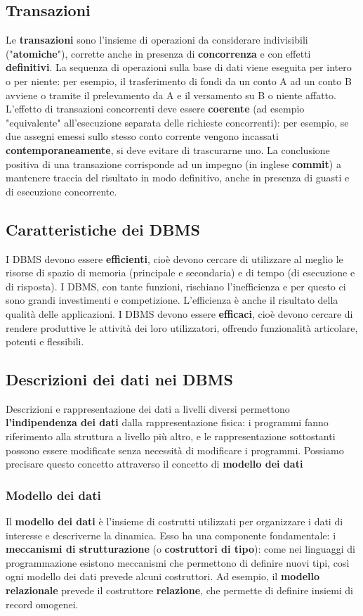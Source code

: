 \documentclass[12pt]{article}
\begin{document}
\subsection{Transazioni}
Le \textbf{transazioni} sono l'insieme di operazioni da considerare indivisibili ("\textbf{atomiche}"), corrette anche in presenza di \textbf{concorrenza} e con effetti \textbf{definitivi}.
La sequenza di operazioni sulla base di dati viene eseguita per intero o per niente: per esempio, il trasferimento di fondi da un conto A ad un conto B avviene o tramite il prelevamento da A e il versamento su B o niente affatto.
L'effetto di transazioni concorrenti deve essere \textbf{coerente} (ad esempio "equivalente" all'esecuzione separata delle richieste concorrenti): per esempio, se due assegni emessi sullo stesso conto corrente vengono incassati \textbf{contemporaneamente},
si deve evitare di trascurarne uno.
La conclusione positiva di una transazione corrisponde ad un impegno (in inglese \textbf{commit}) a mantenere traccia del risultato in modo definitivo, anche in presenza di guasti e di esecuzione concorrente.
\subsection{Caratteristiche dei DBMS}
I DBMS devono essere \textbf{efficienti}, cioè devono cercare di utilizzare al meglio le risorse di spazio di memoria (principale e secondaria) e di tempo (di esecuzione e di risposta).
I DBMS, con tante funzioni, rischiano l'inefficienza e per questo ci sono grandi investimenti e competizione. L'efficienza è anche il risultato della qualità delle applicazioni. \newline
I DBMS devono essere \textbf{efficaci}, cioè devono cercare di rendere produttive le attività dei loro utilizzatori, offrendo funzionalità articolare, potenti e flessibili.
\subsection{Descrizioni dei dati nei DBMS}
Descrizioni e rappresentazione dei dati a livelli diversi permettono \textbf{l'indipendenza dei dati} dalla rappresentazione fisica: i programmi fanno riferimento alla struttura a livello più altro, e le rappresentazione sottostanti possono essere modificate senza necessità di modificare i programmi.
Possiamo precisare questo concetto attraverso il concetto di \textbf{modello dei dati}
\subsubsection{Modello dei dati}
Il \textbf{modello dei dati} è l'insieme di costrutti utilizzati per organizzare i dati di interesse e descriverne la dinamica.
Esso ha una componente fondamentale: i \textbf{meccanismi di strutturazione} (o \textbf{costruttori di tipo}): come nei linguaggi di programmazione
esistono meccanismi che permettono di definire nuovi tipi, così ogni modello dei dati prevede alcuni costruttori.
Ad esempio, il \textbf{modello relazionale} prevede il costruttore \textbf{relazione}, che permette di definire insiemi di record omogenei.
\end{document}
